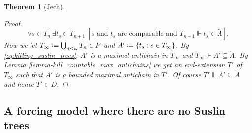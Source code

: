 \documentclass[11pt,a4paper]{report}
\newtheorem{theorem}{Theorem}[chapter] %
\theoremstyle{definition}
\theoremstyle{num.custom-title}
\theoremstyle{custom-title}
\DeclareMathOperator{\sse}{\subseteq}
\newcommand*{\defeq}{\mathrel{\rlap{%
                     \raisebox{0.3ex}{$\cdot$}}%
                     \raisebox{-0.3ex}{$\cdot$}}%
                     =}
\newcommand{\forces}{\Vdash}
\begin{document}
\begin{theorem}[Jech]
\begin{proof}
\begin{equation}\label{eq:killing_suslin_trees}
\forall s \in T_n \ \exists t_s \in T_{n+1} \ [\text{$s$ and $t_s$ are comparable and $T_{n+1} \forces t_s \in \dot{A}$}].
\end{equation}
Now we let $T_\infty \defeq \bigcup_{n < \omega} T_n \in P$ and $A' \defeq \{t_s : s \in T_\infty\}$. By \eqref{eq:killing_suslin_trees}, $A'$ is a maximal antichain in $T_\infty$ and $T_\infty \forces A' \sse \dot{A}$. By Lemma \ref{lemma-kill_countable_max_antichains} we get an end-extension $T'$ of $T_\infty$ such that $A'$ is a bounded maximal antichain in $T'$. Of course $T' \forces A' \sse \dot{A}$ and hence $T' \in D$.
\end{proof}
\end{theorem}


\subsection{A forcing model where there are no Suslin trees}
\end{document}
